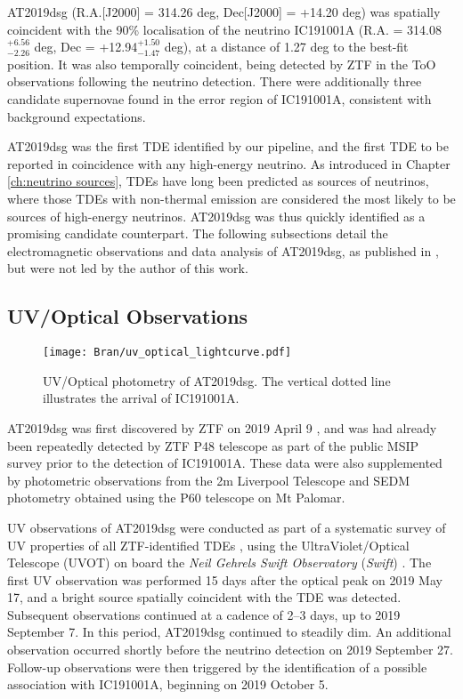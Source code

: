AT2019dsg (R.A.[J2000] = 314.26 deg, Dec[J2000] = +14.20 deg) was spatially coincident with the 90\% localisation of the neutrino IC191001A (R.A. = 314.08$^{+6.56}_{-2.26}$ deg,  Dec = +12.94$^{+1.50}_{-1.47}$ deg), at a distance of 1.27 deg to the best-fit position. It was also temporally coincident, being detected by ZTF in the ToO observations following the neutrino detection. There were additionally three candidate supernovae found in the error region of IC191001A, consistent with background expectations. 

AT2019dsg was the first TDE identified by our pipeline, and the first TDE to be reported in coincidence with any high-energy neutrino. As introduced in Chapter \ref{ch:neutrino sources}, TDEs have long been predicted as sources of neutrinos, where those TDEs with non-thermal emission are considered the most likely to be sources of high-energy neutrinos. AT2019dsg was thus quickly identified as a promising candidate counterpart. The following subsections detail the electromagnetic observations and data analysis of AT2019dsg, as published in \cite{bran}, but were not led by the author of this work.

\subsection*{UV/Optical Observations}

\begin{figure}[!ht]
	\texttt{[image: Bran/uv\_optical\_lightcurve.pdf]}
	\caption{UV/Optical photometry of AT2019dsg. The vertical dotted line illustrates the arrival of IC191001A.}
	\label{fig:bran_optical_lightcurve}
\end{figure}

AT2019dsg was first discovered by ZTF on 2019 April 9 , and was had already been repeatedly detected by ZTF P48 telescope as part of the public MSIP survey prior to the detection of IC191001A.  These data were also supplemented by photometric observations from the 2m Liverpool Telescope  and SEDM  photometry obtained using the P60 telescope on Mt Palomar. 

UV observations of AT2019dsg were conducted as part of a systematic survey of UV properties of all ZTF-identified TDEs \cite{van_velzen_20}, using the UltraViolet/Optical Telescope (UVOT) on board the \textit{Neil Gehrels Swift Observatory} (\textit{Swift}) . The first UV observation was performed 15 days after the optical peak on 2019 May 17, and a bright source spatially coincident with the TDE was detected. Subsequent observations continued at a cadence of 2--3 days, up to 2019 September 7. In this period, AT2019dsg continued to steadily dim. An additional observation occurred shortly before the neutrino detection on 2019 September 27. Follow-up observations were then triggered by the identification of a possible association with IC191001A, beginning on 2019 October 5. 

